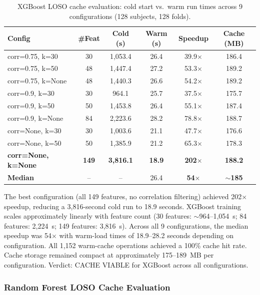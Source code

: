 \begin{table}[htbp]
\centering
\caption[XGBoost LOSO cache evaluation]{XGBoost LOSO cache evaluation: cold start vs.\ warm run times across
9 configurations (128 subjects, 128 folds).}
\label{tab:xgb_cache_results}
\begin{tabular}{lccccc}
\toprule
\textbf{Config} & \textbf{\#Feat} & \textbf{Cold (s)} & \textbf{Warm (s)} & \textbf{Speedup} & \textbf{Cache (MB)} \\
\midrule
corr=0.75, k=30 & 30 & 1{,}053.4 & 26.4 & 39.9$\times$ & 186.4 \\
corr=0.75, k=50 & 48 & 1{,}447.4 & 27.2 & 53.3$\times$ & 189.2 \\
corr=0.75, k=None & 48 & 1{,}440.3 & 26.6 & 54.2$\times$ & 189.2 \\
corr=0.9, k=30 & 30 & 964.1 & 25.7 & 37.5$\times$ & 175.7 \\
corr=0.9, k=50 & 50 & 1{,}453.8 & 26.4 & 55.1$\times$ & 187.4 \\
corr=0.9, k=None & 84 & 2{,}223.6 & 28.2 & 78.8$\times$ & 188.7 \\
corr=None, k=30 & 30 & 1{,}003.6 & 21.1 & 47.7$\times$ & 176.6 \\
corr=None, k=50 & 50 & 1{,}385.9 & 21.2 & 65.3$\times$ & 178.3 \\
\textbf{corr=None, k=None} & \textbf{149} & \textbf{3{,}816.1} & \textbf{18.9} & \textbf{202$\times$} & \textbf{188.2} \\
\midrule
\textbf{Median} & -- & -- & 26.4 & \textbf{54$\times$} & \textbf{$\sim$185} \\
\bottomrule
\end{tabular}
\end{table}

The best configuration (all 149 features, no correlation filtering) achieved
202$\times$ speedup, reducing a 3{,}816-second cold run to 18.9 seconds.
XGBoost training scales approximately linearly with feature count
(30 features: $\sim$964--1{,}054~s; 84 features: 2{,}224~s; 149 features: 3{,}816~s).
Across all 9 configurations, the median speedup was 54$\times$ with warm-load
times of 18.9--28.2 seconds depending on configuration.
All 1{,}152 warm-cache operations achieved a 100\% cache hit rate.
Cache storage remained compact at approximately 175--189~MB per configuration.
Verdict: CACHE VIABLE for XGBoost across all configurations.

\subsubsection{Random Forest LOSO Cache Evaluation}

